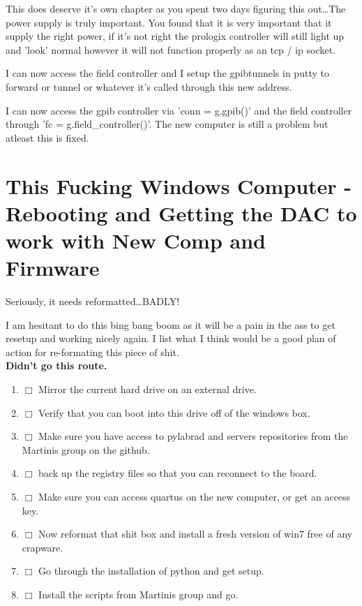 \documentclass[10pt]{book}
\begin{document}
{This does deserve it's own chapter as you spent two days figuring this out\ldots The power supply is truly important. You found that it is very important that it supply the right power, if it's not right the prologix controller will still light up and 'look' normal however it will not function properly as an tcp / ip socket.

I can now access the field controller and I setup the gpibtunnels in putty to forward or tunnel or whatever it's called through this new address. 

I can now access the gpib controller via 'conn = g.gpib()' and the field controller through 'fc = g.field\_controller()'. The new computer is still a problem but atleast this is fixed.


\chapter{This Fucking Windows Computer - Rebooting and Getting the DAC to work with New Comp and Firmware}
Seriously, it needs reformatted\ldots BADLY! 

I am hesitant to do this bing bang boom as it will be a pain in the ass to get resetup and working nicely again. I list what I think would be a good plan of action for re-formating this piece of shit.\\

{\bf Didn't go this route.}

\begin{enumerate}
    \item $\Box$ Mirror the current hard drive on an external drive.
    \item $\Box$ Verify that you can boot into this drive off of the windows box.
    \item $\Box$ Make sure you have access to pylabrad and servers repositories from the Martinis group on the github. 
    \item $\Box$ back up the registry files so that you can reconnect to the board.
    \item $\Box$ Make sure you can access quartus on the new computer, or get an access key.
    \item $\Box$ Now reformat that shit box and install a fresh version of win7 free of any crapware.
    \item $\Box$ Go through the installation of python and get setup.
    \item $\Box$ Install the scripts from Martinis group and go.\\
\end{enumerate}

}
\end{document}
